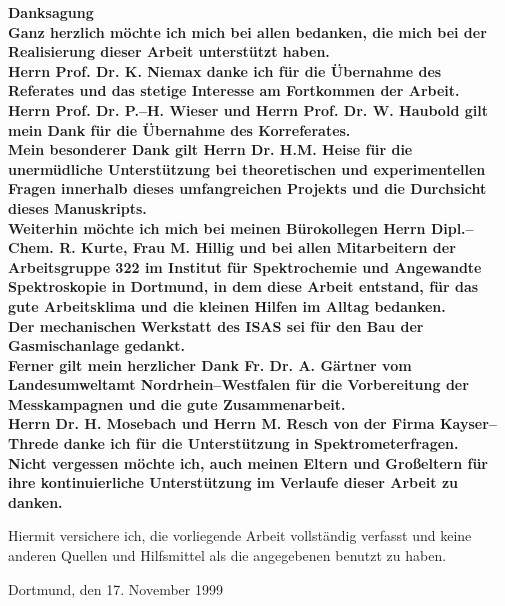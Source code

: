 \thispagestyle{empty}


\noindent\large\bf Danksagung \rm\normalsize\\

\noindent Ganz herzlich m\"{o}chte ich mich bei allen bedanken, die
mich bei der Realisierung dieser Arbeit unterst\"{u}tzt haben.\\

\noindent Herrn Prof. Dr. K. Niemax danke ich f\"{u}r die \"{U}bernahme
des Referates und das stetige Interesse am Fortkommen der
Arbeit.\\

\noindent Herrn Prof. Dr. P.--H. Wieser und Herrn Prof. Dr. W.
Haubold gilt mein Dank f\"{u}r die \"{U}bernahme des Korreferates.\\

\noindent Mein besonderer Dank gilt Herrn Dr. H.M. Heise  f\"{u}r die
unerm\"{u}dliche Unterst\"{u}tzung bei theoretischen und experimentellen
Fragen innerhalb dieses umfangreichen Projekts und die Durchsicht
dieses Manuskripts.\\

\noindent Weiterhin m\"{o}chte ich mich bei meinen B\"{u}rokollegen Herrn
Dipl.--Chem. R. Kurte, Frau M. Hillig und bei allen Mitarbeitern
der Arbeitsgruppe 322 im Institut f\"{u}r Spektrochemie und Angewandte
Spektroskopie in Dortmund, in dem diese Arbeit entstand, f\"{u}r das
gute Arbeitsklima und die kleinen Hilfen im Alltag bedanken.\\

\noindent Der mechanischen Werkstatt des ISAS sei f\"{u}r den Bau der
Gasmischanlage gedankt.\\

\noindent Ferner gilt mein herzlicher Dank Fr. Dr. A. G\"{a}rtner vom
Landesumweltamt Nordrhein--Westfalen f\"{u}r die Vorbereitung der
Messkampagnen und die gute Zusammenarbeit.\\

\noindent Herrn Dr. H. Mosebach und Herrn M. Resch von der Firma
Kayser--Threde danke ich f\"{u}r die Unterst\"{u}tzung in
Spektrometerfragen.\\

\noindent Nicht vergessen m\"{o}chte ich, auch meinen Eltern und
Gro{\ss}eltern f\"{u}r ihre kontinuierliche Unterst\"{u}tzung im Verlaufe
dieser Arbeit zu danken.\\

\clearpage
\thispagestyle{empty}

\noindent Hiermit versichere ich, die vorliegende Arbeit
vollst\"{a}ndig verfasst und keine anderen Quellen und Hilfsmittel als
die angegebenen benutzt zu haben.\\

\vspace{2cm}

\noindent Dortmund, den 17. November 1999
